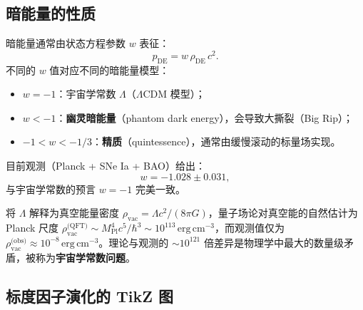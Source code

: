 \subsection{暗能量的性质}

\begin{definition}[暗能量状态方程]
暗能量通常由状态方程参数 $w$ 表征：
\begin{equation}
    p_{\text{DE}} = w \,\rho_{\text{DE}} \,c^2.
\end{equation}
不同的 $w$ 值对应不同的暗能量模型：
\begin{itemize}
    \item $w = -1$：宇宙学常数 $\Lambda$（$\Lambda$CDM 模型）；
    \item $w < -1$：\textbf{幽灵暗能量}（phantom dark energy），会导致大撕裂（Big Rip）；
    \item $-1 < w < -1/3$：\textbf{精质}（quintessence），通常由缓慢滚动的标量场实现。
\end{itemize}
\end{definition}

目前观测（Planck + SNe Ia + BAO）给出：
\begin{equation}
    \boxed{w = -1.028 \pm 0.031},
\end{equation}
与宇宙学常数的预言 $w = -1$ 完美一致。

\begin{note}[宇宙学常数问题]
将 $\Lambda$ 解释为真空能量密度 $\rho_{\text{vac}} = \Lambda c^2 / (8\pi G)$，量子场论对真空能的自然估计为 Planck 尺度 $\rho_{\text{vac}}^{\text{(QFT)}} \sim M_{\text{Pl}}^4 c^5 / \hbar^3 \sim 10^{113}\,\text{erg}\,\text{cm}^{-3}$，而观测值仅为 $\rho_{\text{vac}}^{\text{(obs)}} \approx 10^{-8}\,\text{erg}\,\text{cm}^{-3}$。理论与观测的 $\sim 10^{121}$ 倍差异是物理学中最大的数量级矛盾，被称为\textbf{宇宙学常数问题}。
\end{note}

\subsection{标度因子演化的 TikZ 图}

